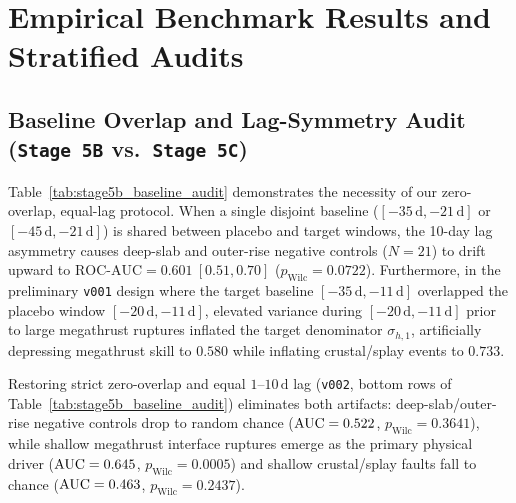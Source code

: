 ﻿\documentclass[journal]{IEEEtran}
\begin{document}
\section{Empirical Benchmark Results and Stratified Audits}

\subsection{Baseline Overlap and Lag-Symmetry Audit (\texttt{Stage 5B} vs.\ \texttt{Stage 5C})}
Table~\ref{tab:stage5b_baseline_audit} demonstrates the necessity of our zero-overlap, equal-lag protocol. When a single disjoint baseline ($[-35\,\text{d}, -21\,\text{d}]$ or $[-45\,\text{d}, -21\,\text{d}]$) is shared between placebo and target windows, the 10-day lag asymmetry causes deep-slab and outer-rise negative controls ($N=21$) to drift upward to $\text{ROC-AUC} = 0.601\ [0.51, 0.70]$ ($p_{\text{Wilc}} = 0.0722$). Furthermore, in the preliminary \texttt{v001} design where the target baseline $[-35\,\text{d}, -11\,\text{d}]$ overlapped the placebo window $[-20\,\text{d}, -11\,\text{d}]$, elevated variance during $[-20\,\text{d}, -11\,\text{d}]$ prior to large megathrust ruptures inflated the target denominator $\sigma_{h,1}$, artificially depressing megathrust skill to $0.580$ while inflating crustal/splay events to $0.733$.

Restoring strict zero-overlap and equal $1\text{--}10\,\text{d}$ lag (\texttt{v002}, bottom rows of Table~\ref{tab:stage5b_baseline_audit}) eliminates both artifacts: deep-slab/outer-rise negative controls drop to random chance ($\text{AUC} = 0.522$, $p_{\text{Wilc}} = 0.3641$), while shallow megathrust interface ruptures emerge as the primary physical driver ($\text{AUC} = 0.645$, $p_{\text{Wilc}} = 0.0005$) and shallow crustal/splay faults fall to chance ($\text{AUC} = 0.463$, $p_{\text{Wilc}} = 0.2437$).


\end{document}
